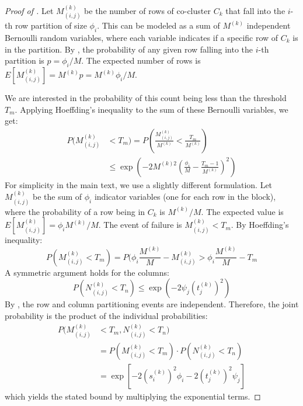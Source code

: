 \documentclass[journal]{IEEEtran}
\theoremstyle{definition}
\theoremstyle{remark} %
\begin{document}
\begin{proof}[Proof of ]
    Let $M_{(i,j)}^{(k)}$ be the number of rows of co-cluster $C_k$ that fall into the $i$-th row partition of size $\phi_i$. This can be modeled as a sum of $M^{(k)}$ independent Bernoulli random variables, where each variable indicates if a specific row of $C_k$ is in the partition. By , the probability of any given row falling into the $i$-th partition is $p = \phi_i / M$. The expected number of rows is $E[M_{(i,j)}^{(k)}] = M^{(k)} p = M^{(k)} \phi_i / M$.

    We are interested in the probability of this count being less than the threshold $T_m$. Applying Hoeffding's inequality to the sum of these Bernoulli variables, we get:
    \begin{equation}
        \begin{aligned}
            P(M_{(i,j)}^{(k)} & < T_m) = P\left(\frac{M_{(i,j)}^{(k)}}{M^{(k)}} < \frac{T_m}{M^{(k)}}\right)              \\
                              & \le \exp\left(-2 M^{(k)2} \left(\frac{\phi_i}{M} - \frac{T_m-1}{M^{(k)}}\right)^2 \right)
        \end{aligned}
    \end{equation}
    For simplicity in the main text, we use a slightly different formulation. Let $M_{(i,j)}^{(k)}$ be the sum of $\phi_i$ indicator variables (one for each row in the block), where the probability of a row being in $C_k$ is $M^{(k)}/M$. The expected value is $E[M_{(i,j)}^{(k)}] = \phi_i M^{(k)}/M$. The event of failure is $M_{(i,j)}^{(k)} < T_m$. By Hoeffding's inequality:
    \begin{equation}
        P(M_{(i,j)}^{(k)} < T_m) = P(\phi_i \frac{M^{(k)}}{M} - M_{(i,j)}^{(k)} > \phi_i \frac{M^{(k)}}{M} - T_m
    \end{equation}
    A symmetric argument holds for the columns:
    \begin{equation}
        P(N_{(i,j)}^{(k)} < T_n) \le \exp(-2 \psi_j (t_j^{(k)})^2)
    \end{equation}
    By , the row and column partitioning events are independent. Therefore, the joint probability is the product of the individual probabilities:
    \begin{equation}
        \begin{aligned}
            P(M_{(i,j)}^{(k)} & < T_m, N_{(i,j)}^{(k)} < T_n)                                      \\
                              & = P(M_{(i,j)}^{(k)} < T_m) \cdot P(N_{(i,j)}^{(k)} < T_n)          \\
                              & = \exp\left[-2 (s_i^{(k)})^2 \phi_i -2 (t_j^{(k)})^2 \psi_j\right]
        \end{aligned}
    \end{equation}
    which yields the stated bound by multiplying the exponential terms.
\end{proof}
\end{document}
